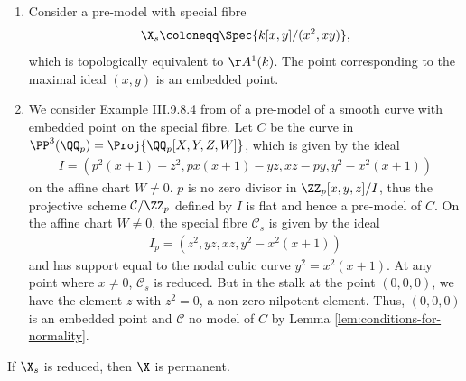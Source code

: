 \begin{example}
    \begin{enumerate}
        \item Consider a pre-model with special fibre
            \begin{align}
                \X_s \coloneqq \Spec{k[x,y]/(x^2,xy)},
            \end{align}
            which is topologically equivalent to $\AA^1(k)$.
            The point corresponding to the maximal ideal $(x,y)$ is an embedded point.
        \item We consider Example \textrm{III}.9.8.4 from \cite{Hartshorne} of a pre-model of a smooth curve with embedded point on the special fibre.
            Let $C$ be the curve in $\PP^3(\QQ_p) = \Proj{\QQ_p[X,Y,Z,W]}$, which is given by the ideal 
            \begin{align}
                I = \left(p^2(x+1) - z^2, px(x+1) - yz, xz - py, y^2 - x^2(x+1) \right)
            \end{align}
            on the affine chart $W \neq 0$.
            $p$ is no zero divisor in $\ZZ_p[x,y,z]/I$, thus the projective scheme $\mathcal{C}/\ZZ_p$ defined by $I$
            is flat and hence a pre-model of $C$.
            On the affine chart $W \neq 0$, the special fibre $\mathcal{C}_s$ is given by the ideal 
            \begin{align}
                I_p = (z^2, yz, xz, y^2 - x^2(x+1))
            \end{align}
            and has support equal to the nodal cubic curve $y^2 = x^2(x+1)$.
            At any point where $x \neq 0$, $\mathcal{C}_s$ is reduced.
            But in the stalk at the point $(0,0,0)$, we have the element $z$ with $z^2=0$, a non-zero nilpotent element.
            Thus, $(0,0,0)$ is an embedded point and $\mathcal{C}$ no model of $C$ by Lemma \ref{lem:conditions-for-normality}.
    \end{enumerate}
\end{example}

\begin{proposition} \label{prop:reducedness-implies-permanence}
    If $\X_s$ is reduced, then $\X$ is permanent.
\end{proposition}

